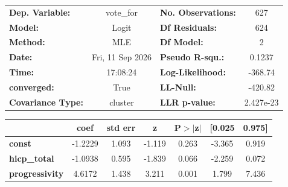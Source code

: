 \begin{center}
\begin{tabular}{lclc}
\toprule
\textbf{Dep. Variable:}   &    vote\_for     & \textbf{  No. Observations:  } &      627    \\
\textbf{Model:}           &      Logit       & \textbf{  Df Residuals:      } &      624    \\
\textbf{Method:}          &       MLE        & \textbf{  Df Model:          } &        2    \\
\textbf{Date:}            & Fri, 11 Sep 2026 & \textbf{  Pseudo R-squ.:     } &   0.1237    \\
\textbf{Time:}            &     17:08:24     & \textbf{  Log-Likelihood:    } &   -368.74   \\
\textbf{converged:}       &       True       & \textbf{  LL-Null:           } &   -420.82   \\
\textbf{Covariance Type:} &     cluster      & \textbf{  LLR p-value:       } & 2.427e-23   \\
\bottomrule
\end{tabular}
\begin{tabular}{lcccccc}
                       & \textbf{coef} & \textbf{std err} & \textbf{z} & \textbf{P$> |$z$|$} & \textbf{[0.025} & \textbf{0.975]}  \\
\midrule
\textbf{const}         &      -1.2229  &        1.093     &    -1.119  &         0.263        &       -3.365    &        0.919     \\
\textbf{hicp\_total}   &      -1.0938  &        0.595     &    -1.839  &         0.066        &       -2.259    &        0.072     \\
\textbf{progressivity} &       4.6172  &        1.438     &     3.211  &         0.001        &        1.799    &        7.436     \\
\bottomrule
\end{tabular}
\end{center}